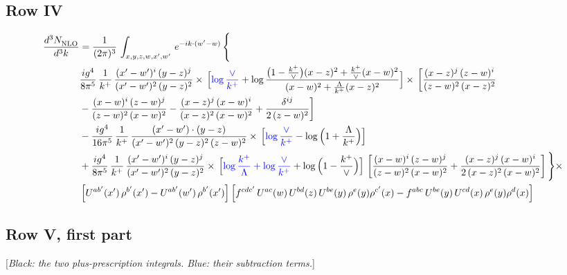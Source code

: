 \documentclass[9pt]{article}
\numberwithin{equation}{section}
\newcommand{\rnote}[1]{{\color{teal}[\textit{#1}]}}
\begin{document}
\subsection{Row IV}

\begin{align}
    \frac{d^{3}N_{\rm NLO}^{\rm}}{d^{3}k}  & =  \frac{1}{(2\pi)^{3}}\,
    \int_{x,y,z,w,x',w'}\,e^{-ik\cdot (w^\prime-w)}\,\Bigg\{\notag \\ & \frac{ig^{4}}{8\pi^{5}}\,\frac{1}{k^{+}}\,\frac{(x'-w')^{i}\,(y-z)^{j}}{(x'-w')^{2}\,(y-z)^{2}}\times\,\Big[{\color{blue}\log\frac{\vee}{k^{+}}}+\log\frac{\big(1-\frac{k^{+}}{\vee}\big)(x-z)^{2}+\frac{k^{+}}{\vee}(x-w)^{2}}{(x-w)^{2}+\frac{\Lambda}{k^{+}}(x-z)^{2}}\Big]\times\, \bigg[\frac{(x-z)^{j}\,(z-w)^{i}}{(z-w)^{2}\,(x-z)^{2}}\notag \\ & -\frac{(x-w)^{i}\,(z-w)^{j}}{(z-w)^{2}\,(x-w)^{2}}-\frac{(x-z)^{j}\,(x-w)^{i}}{(x-z)^{2}\,(x-w)^{2}}+\frac{\delta^{ij}}{2\,(z-w)^{2}}\bigg]\notag \\ & -\frac{ig^{4}}{16\pi^{5}}\,\frac{1}{k^{+}}\,\frac{(x'-w')\cdot (y-z)}{(x'-w')^{2}\,(y-z)^{2}\,(z-w)^{2}}\times\,\Big[{\color{blue}\log\frac{\vee}{k^{+}}}-\log\Big(1+\frac{\Lambda}{k^{+}}\Big)\Big]\notag \\ & + \frac{ig^{4}}{8\pi^{5}}\,\frac{1}{k^{+}}\,\frac{(x'-w')^{i}\,(y-z)^{j}}{(x'-w')^{2}\,(y-z)^{2}}\times\,\Big[{\color{blue}\log\frac{k^{+}}{\Lambda}+\log\frac{\vee}{k^{+}}}+\log\Big(1-\frac{k^{+}}{\vee}\Big)\Big]\,\left[\frac{(x-w)^{i}\,(z-w)^{j}}{(z-w)^{2}\,(x-w)^{2}}+\frac{(x-z)^{j}\,(x-w)^{i}}{2\, (x-z)^{2}\,(x-w)^{2}}\right] \Bigg\}\times\notag \\ &  \left[U^{ab'}(x')\,\rho^{b'}(x')-U^{ab'}(w')\,\rho^{b'}(x')\right] \left[f^{cdc'}\,U^{ac}(w)\,U^{bd}(z)\,U^{be}(y)\,\rho^{e}(y)\rho^{c'}(x)-f^{abc}\,U^{be}(y)\,U^{cd}(x)\,\rho^{e}(y)\rho^{d}(x)\right]
\end{align}

\subsection{Row V, first part}

\rnote{Black: the two plus-prescription integrals. Blue: their subtraction terms.}
\end{document}
